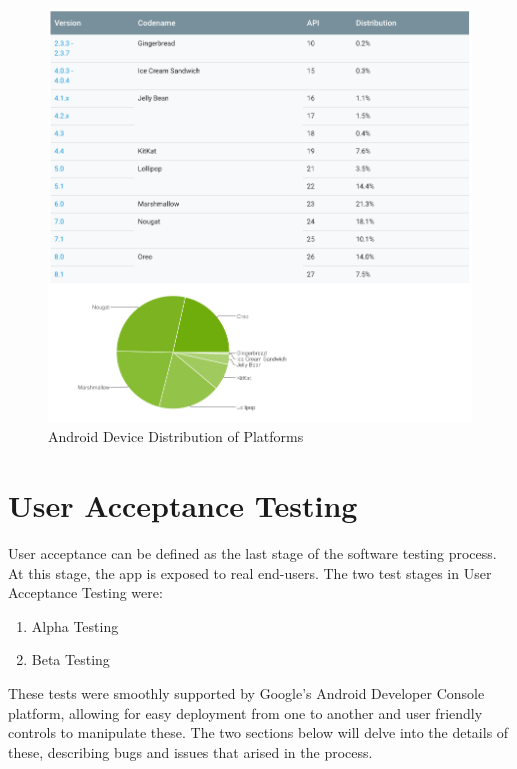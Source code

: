 \begin{figure}
    \includegraphics[width=1.2\textwidth, center]{figures/Androidversionstats.png}
    \caption{Android Device Distribution of Platforms}
    \label{fig:Androidversionstats.png}
\end{figure}
\section{User Acceptance Testing}
User acceptance can be defined as the last stage of the software testing process. At this stage, the app is exposed to real end-users. The two test stages in User Acceptance Testing were:
\begin{enumerate}
    \item Alpha Testing
    \item Beta Testing
\end{enumerate}
These tests were smoothly supported by Google's Android Developer Console platform, allowing for easy deployment from one to another and user friendly controls to manipulate these. The two sections below will delve into the details of these, describing bugs and issues that arised in the process.

